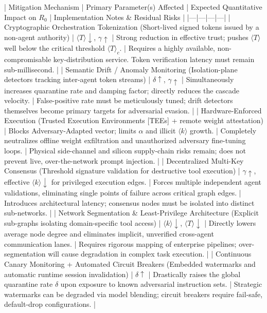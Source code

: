 | Mitigation Mechanism | Primary Parameter(s) Affected | Expected Quantitative Impact on $R_0$ | Implementation Notes & Residual Risks |
|---|---|---|---|
| Cryptographic Orchestration Tokenization (Short-lived signed tokens issued by a non-agent authority) | $\langle T\rangle \downarrow$, $\gamma \uparrow$ | Strong reduction in effective trust; pushes $\langle T\rangle$ well below the critical threshold $\langle T\rangle_c$. | Requires a highly available, non-compromisable key-distribution service. Token verification latency must remain sub-millisecond. |
| Semantic Drift / Anomaly Monitoring (Isolation-plane detectors tracking inter-agent token streams) | $\delta \uparrow$, $\gamma \uparrow$ | Simultaneously increases quarantine rate and damping factor; directly reduces the cascade velocity. | False-positive rate must be meticulously tuned; drift detectors themselves become primary targets for adversarial evasion. |
| Hardware-Enforced Execution (Trusted Execution Environments [TEEs] + remote weight attestation) | Blocks Adversary-Adapted vector; limits $\alpha$ and illicit $\langle k\rangle$ growth. | Completely neutralizes offline weight exfiltration and unauthorized adversary fine-tuning loops. | Physical side-channel and silicon supply-chain risks remain; does not prevent live, over-the-network prompt injection. |
| Decentralized Multi-Key Consensus (Threshold signature validation for destructive tool execution) | $\gamma \uparrow$, effective $\langle k\rangle \downarrow$ for privileged execution edges. | Forces multiple independent agent validations, eliminating single points of failure across critical graph edges. | Introduces architectural latency; consensus nodes must be isolated into distinct sub-networks. |
| Network Segmentation & Least-Privilege Architecture (Explicit sub-graphs isolating domain-specific tool access) | $\langle k\rangle \downarrow$, $\langle T\rangle \downarrow$ | Directly lowers average node degree and eliminates implicit, unverified cross-agent communication lanes. | Requires rigorous mapping of enterprise pipelines; over-segmentation will cause degradation in complex task execution. |
| Continuous Canary Monitoring + Automated Circuit Breakers (Embedded watermarks and automatic runtime session invalidation) | $\delta \uparrow$ | Drastically raises the global quarantine rate $\delta$ upon exposure to known adversarial instruction sets. | Strategic watermarks can be degraded via model blending; circuit breakers require fail-safe, default-drop configurations. |

